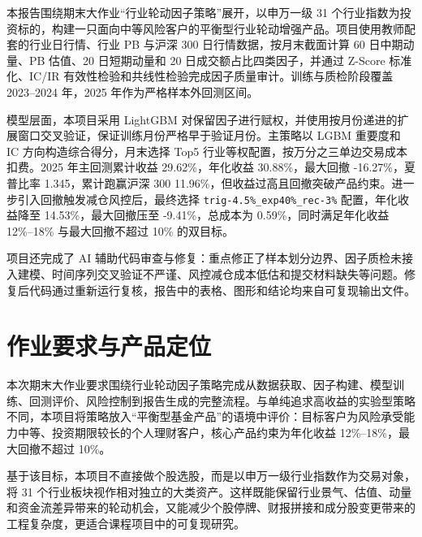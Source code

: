\documentclass[UTF8,a4paper,12pt]{ctexart}
\author{丁致宇}
\date{2026年7月}
\begin{document}
\maketitle

\begin{ustcabstract}
本报告围绕期末大作业“行业轮动因子策略”展开，以申万一级 31 个行业指数为投资标的，构建一只面向中等风险客户的平衡型行业轮动增强产品。项目使用教师配套的行业日行情、行业 PB 与沪深 300 日行情数据，按月末截面计算 60 日中期动量、PB 估值、20 日短期动量和 20 日成交额占比四类因子，并通过 Z-Score 标准化、IC/IR 有效性检验和共线性检验完成因子质量审计。训练与质检阶段覆盖 2023--2024 年，2025 年作为严格样本外回测区间。

模型层面，本项目采用 LightGBM 对保留因子进行赋权，并使用按月份递进的扩展窗口交叉验证，保证训练月份严格早于验证月份。主策略以 LGBM 重要度和 IC 方向构造综合得分，月末选择 Top5 行业等权配置，按万分之三单边交易成本扣费。2025 年主回测累计收益 29.62\%，年化收益 30.88\%，最大回撤 -16.27\%，夏普比率 1.345，累计跑赢沪深 300 11.96\%，但收益过高且回撤突破产品约束。进一步引入回撤触发减仓风控后，最终选择 \texttt{trig-4.5\%\_exp40\%\_rec-3\%} 配置，年化收益降至 14.53\%，最大回撤压至 -9.41\%，总成本为 0.59\%，同时满足年化收益 12\%--18\% 与最大回撤不超过 10\% 的双目标。

项目还完成了 AI 辅助代码审查与修复：重点修正了样本划分边界、因子质检未接入建模、时间序列交叉验证不严谨、风控减仓成本低估和提交材料缺失等问题。修复后代码通过重新运行复核，报告中的表格、图形和结论均来自可复现输出文件。
\end{ustcabstract}

\clearpage
\tableofcontents
\clearpage

\section{作业要求与产品定位}

本次期末大作业要求围绕行业轮动因子策略完成从数据获取、因子构建、模型训练、回测评价、风险控制到报告生成的完整流程。与单纯追求高收益的实验型策略不同，本项目将策略放入“平衡型基金产品”的语境中评价：目标客户为风险承受能力中等、投资期限较长的个人理财客户，核心产品约束为年化收益 12\%--18\%，最大回撤不超过 10\%。

基于该目标，本项目不直接做个股选股，而是以申万一级行业指数作为交易对象，将 31 个行业板块视作相对独立的大类资产。这样既能保留行业景气、估值、动量和资金流差异带来的轮动机会，又能减少个股停牌、财报拼接和成分股变更带来的工程复杂度，更适合课程项目中的可复现研究。
\end{document}
